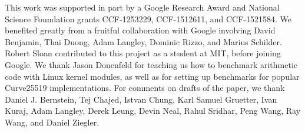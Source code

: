 \documentclass[conference,letterpaper]{IEEEtran}
\begin{document}
This work was supported in part by a Google Research Award and National Science Foundation grants CCF-1253229, CCF-1512611, and CCF-1521584.
We benefited greatly from a fruitful collaboration with Google involving David Benjamin, Thai Duong, Adam Langley, Dominic Rizzo, and Marius Schilder.
Robert Sloan contributed to this project as a student at MIT, before joining Google.
We thank Jason Donenfeld for teaching us how to benchmark arithmetic code with Linux kernel modules, as well as for setting up benchmarks for popular Curve25519 implementations.
For comments on drafts of the paper, we thank Daniel J. Bernstein, Tej Chajed, Istvan Chung, Karl Samuel Gruetter, Ivan Kuraj, Adam Langley, Derek Leung, Devin Neal, Rahul Sridhar, Peng Wang, Ray Wang, and Daniel Ziegler.

\balance


\newpage

\appendices
\end{document}
